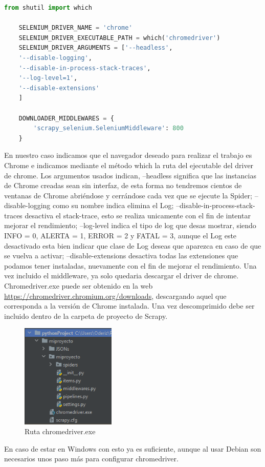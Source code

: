 \begin{lstlisting}[language=Python, caption={Agua en Navarra configuración Selenium}]
	from shutil import which
	
	SELENIUM_DRIVER_NAME = 'chrome'
	SELENIUM_DRIVER_EXECUTABLE_PATH = which('chromedriver')
	SELENIUM_DRIVER_ARGUMENTS = ['--headless',
	'--disable-logging',
	'--disable-in-process-stack-traces',
	'--log-level=1',
	'--disable-extensions'
	]
	
	DOWNLOADER_MIDDLEWARES = {
		'scrapy_selenium.SeleniumMiddleware': 800
	}
\end{lstlisting}

En nuestro caso indicamos que el navegador deseado para realizar el trabajo es Chrome e indicamos mediante el método which la ruta del ejecutable del driver de chrome.\newline
\newline
Los argumentos usados indican, --headless significa que las instancias de Chrome creadas sean sin interfaz, de esta forma no tendremos cientos de ventanas de Chrome abriéndose y cerrándose cada vez que se ejecute la Spider; --disable-logging como su nombre indica elimina el Log; --disable-in-process-stack-traces desactiva el stack-trace, esto se realiza unicamente con el fin de intentar mejorar el rendimiento; --log-level indica el tipo de log que desas mostrar, siendo INFO = 0, ALERTA = 1, ERROR = 2 y FATAL = 3, aunque el Log este desactivado esta bien indicar que clase de Log deseas que aparezca en caso de que se vuelva a activar; --disable-extensions desactiva todas las extensiones que podamos tener instaladas, nuevamente con el fin de mejorar el rendimiento.\newline
\newline
Una vez incluido el middleware, ya solo quedaria descargar el driver de chrome.\newline
\newline
Chromedriver.exe puede ser obtenido en la web \url{https://chromedriver.chromium.org/downloads}, descargando aquel que corresponda a la versión de Chrome instalada. Una vez descomprimido debe ser incluido dentro de la carpeta de proyecto de Scrapy.

\begin{figure} [h!]
	\centering
	\includegraphics[width=0.4\textwidth]{fig/chromedriver.png}
	\caption[Ruta chromedriver.exe]{Ruta chromedriver.exe}
	\label{fig:ej15}
\end{figure}

En caso de estar en Windows con esto ya es suficiente, aunque al usar Debian son necesarios unos paso más para configurar chromedriver.
